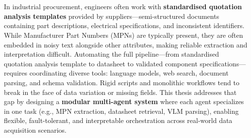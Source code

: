 \chapter{\abstractname}

In industrial procurement, engineers often work with \textbf{standardised quotation analysis templates} provided by suppliers—semi-structured documents containing part descriptions, electrical specifications, and inconsistent identifiers. While Manufacturer Part Numbers (MPNs) are typically present, they are often embedded in noisy text alongside other attributes, making reliable extraction and interpretation difficult. Automating the full pipeline—from standardised quotation analysis template to datasheet to validated component specifications—requires coordinating diverse tools: language models, web search, document parsing, and schema validation. Rigid scripts and monolithic workflows tend to break in the face of data variation or missing fields. This thesis addresses that gap by designing a \textbf{modular multi-agent system} where each agent specializes in one task (e.g., MPN extraction, datasheet retrieval, VLM parsing), enabling flexible, fault-tolerant, and interpretable orchestration across real-world data acquisition scenarios.
